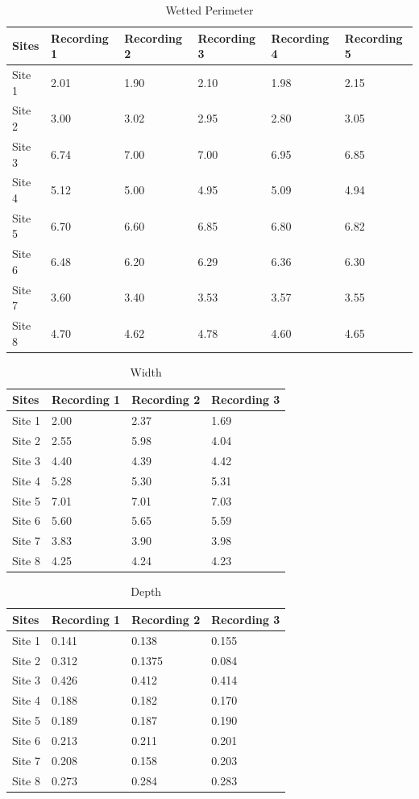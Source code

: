 \begin{table}[H]
	\centering
	\begin{tabularx}{\textwidth}{l *{5}{Y}}
		\hline
		Sites & Recording 1 & Recording 2 & Recording 3 & Recording 4 & Recording 5 \\
		\hline
		Site 1 & 2.01 & 1.90 & 2.10 & 1.98 & 2.15 \\
		Site 2 & 3.00 & 3.02 & 2.95 & 2.80 & 3.05 \\
		Site 3 & 6.74 & 7.00 & 7.00 & 6.95 & 6.85 \\
		Site 4 & 5.12 & 5.00 & 4.95 & 5.09 & 4.94 \\
		Site 5 & 6.70 & 6.60 & 6.85 & 6.80 & 6.82 \\
		Site 6 & 6.48 & 6.20 & 6.29 & 6.36 & 6.30 \\
		Site 7 & 3.60 & 3.40 & 3.53 & 3.57 & 3.55 \\
		Site 8 & 4.70 & 4.62 & 4.78 & 4.60 & 4.65 \\
		\hline
	\end{tabularx}
	\caption{Wetted Perimeter}
	\label{tab:wetted_raw}
\end{table}

\begin{table}[H]
	\centering
	\begin{tabularx}{\textwidth}{l *{3}{Y}}
		\hline
		Sites & Recording 1 & Recording 2 & Recording 3 \\
		\hline
		Site 1 & 2.00 & 2.37 & 1.69 \\
		Site 2 & 2.55 & 5.98 & 4.04 \\
		Site 3 & 4.40 & 4.39 & 4.42 \\
		Site 4 & 5.28 & 5.30 & 5.31 \\
		Site 5 & 7.01 & 7.01 & 7.03 \\
		Site 6 & 5.60 & 5.65 & 5.59 \\
		Site 7 & 3.83 & 3.90 & 3.98 \\
		Site 8 & 4.25 & 4.24 & 4.23 \\
		\hline
	\end{tabularx}
	\caption{Width}
	\label{tab:width_raw}
\end{table}

\begin{table}[H]
	\centering
	\begin{tabularx}{\textwidth}{l *{3}{Y}}
		\hline
		Sites & Recording 1 & Recording 2 & Recording 3 \\
		\hline
		Site 1 & 0.141 & 0.138  & 0.155 \\
		Site 2 & 0.312 & 0.1375 & 0.084 \\
		Site 3 & 0.426 & 0.412  & 0.414 \\
		Site 4 & 0.188 & 0.182  & 0.170 \\
		Site 5 & 0.189 & 0.187  & 0.190 \\
		Site 6 & 0.213 & 0.211  & 0.201 \\
		Site 7 & 0.208 & 0.158  & 0.203 \\
		Site 8 & 0.273 & 0.284  & 0.283 \\
		\hline
	\end{tabularx}
	\caption{Depth}
	\label{tab:depth_raw}
\end{table}

